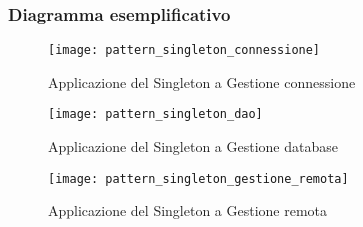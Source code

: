 \subsubsection{Diagramma esemplificativo}
\begin{figure}[H]
  \centering
  \texttt{[image: pattern\_singleton\_connessione]}
  \caption{Applicazione del  Singleton a \textsf{Gestione connessione}}\label{fig:singleton1}
\end{figure}

\begin{figure}[H]
  \centering
  \texttt{[image: pattern\_singleton\_dao]}
  \caption{Applicazione del  Singleton a \textsf{Gestione database}}\label{fig:singleton2}
\end{figure}

\begin{figure}[H]
  \centering
  \texttt{[image: pattern\_singleton\_gestione\_remota]}
  \caption{Applicazione del  Singleton a \textsf{Gestione remota}}\label{fig:singleton3}
\end{figure}

